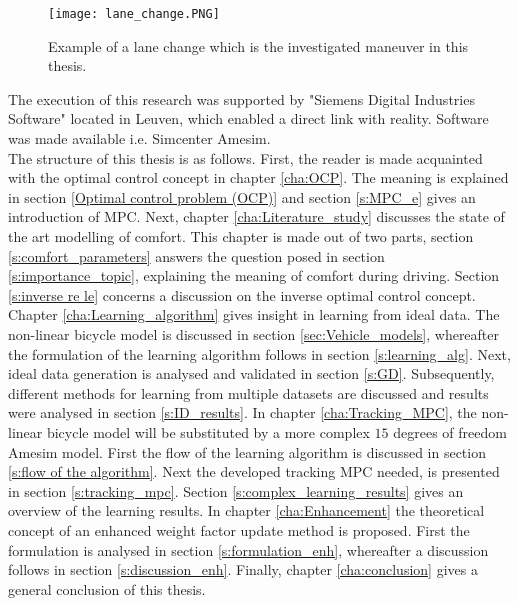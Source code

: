 \begin{figure}[htp]
	\centering
	\texttt{[image: lane\_change.PNG]}
	\caption{Example of a lane change which is the investigated maneuver in this thesis.}
	\label{fig:lane_change}
\end{figure}

The execution of this research was supported by "Siemens Digital Industries Software" located in Leuven, which enabled a direct link with reality. Software was made available i.e. Simcenter Amesim.\\

The structure of this thesis is as follows. First, the reader is made acquainted with the optimal control concept in chapter \ref{cha:OCP}. The meaning is explained in section \ref{Optimal control problem (OCP)} and section \ref{s:MPC_e} gives an introduction of MPC. Next, chapter \ref{cha:Literature_study} discusses the state of the art modelling of comfort. This chapter is made out of two parts, section \ref{s:comfort_parameters} answers the question posed in section \ref{s:importance_topic}, explaining the meaning of comfort during driving. Section \ref{s:inverse re le} concerns a discussion on the inverse optimal control concept. Chapter \ref{cha:Learning_algorithm} gives insight in learning from ideal data. The non-linear bicycle model is discussed in section \ref{sec:Vehicle_models}, whereafter the formulation of the learning algorithm follows in section \ref{s:learning_alg}. Next, ideal data generation is analysed and validated in section \ref{s:GD}. Subsequently, different methods for learning from multiple datasets are discussed and results were analysed in section \ref{s:ID_results}. In chapter \ref{cha:Tracking_MPC}, the non-linear bicycle model will be substituted by a more complex $15$ degrees of freedom Amesim model. First the flow of the learning algorithm is discussed in section \ref{s:flow of the algorithm}. Next the developed tracking MPC needed, is presented in section \ref{s:tracking_mpc}. Section \ref{s:complex_learning_results} gives an overview of the learning results. 
In chapter \ref{cha:Enhancement} the theoretical concept of an enhanced weight factor update method is proposed. First the formulation is analysed in section \ref{s:formulation_enh}, whereafter a discussion follows in section \ref{s:discussion_enh}. Finally, chapter \ref{cha:conclusion} gives a general conclusion of this thesis.


